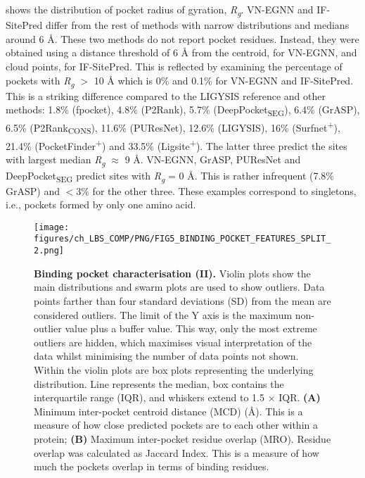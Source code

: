  shows the distribution of pocket radius of gyration, \textit{R\textsubscript{g}}. VN-EGNN and IF-SitePred differ from the rest of methods with narrow distributions and medians around 6 \AA{}. These two methods do not report pocket residues. Instead, they were obtained using a distance threshold of 6 \AA{} from the centroid, for VN-EGNN, and cloud points, for IF-SitePred. This is reflected by examining the percentage of pockets with \textit{R\textsubscript{g}} $>$ 10 \AA{} which is 0\% and 0.1\% for VN-EGNN and IF-SitePred. This is a striking difference compared to the LIGYSIS reference and other methods: 1.8\% (fpocket), 4.8\% (P2Rank), 5.7\% (DeepPocket\textsubscript{SEG}), 6.4\% (GrASP), 6.5\% (P2Rank\textsubscript{CONS}), 11.6\% (PUResNet), 12.6\% (LIGYSIS), 16\% (Surfnet\textsuperscript{+}), 21.4\% (PocketFinder\textsuperscript{+}) and 33.5\% (Ligsite\textsuperscript{+}). The latter three predict the sites with largest median \textit{R\textsubscript{g}} $\approx$ 9 \AA{}. VN-EGNN, GrASP, PUResNet and DeepPocket\textsubscript{SEG} predict sites with \textit{R\textsubscript{g}} = 0 \AA{}. This is rather infrequent (7.8\% GrASP) and $<$3\% for the other three. These examples correspond to singletons, i.e., pockets formed by only one amino acid.

\begin{figure}[ht!]
    \centering
    \texttt{[image: figures/ch\_LBS\_COMP/PNG/FIG5\_BINDING\_POCKET\_FEATURES\_SPLIT\_2.png]}
    \caption[Binding pocket characterisation (II)]{\textbf{Binding pocket characterisation (II).} Violin plots show the main distributions and swarm plots are used to show outliers. Data points farther than four standard deviations (SD) from the mean are considered outliers. The limit of the Y axis is the maximum non-outlier value plus a buffer value. This way, only the most extreme outliers are hidden, which maximises visual interpretation of the data whilst minimising the number of data points not shown. Within the violin plots are box plots representing the underlying distribution. Line represents the median, box contains the interquartile range (IQR), and whiskers extend to 1.5 $\times$ IQR. \textbf{(A)} Minimum inter-pocket centroid distance (MCD) (\AA{}). This is a measure of how close predicted pockets are to each other within a protein; \textbf{(B)} Maximum inter-pocket residue overlap (MRO). Residue overlap was calculated as Jaccard Index. This is a measure of how much the pockets overlap in terms of binding residues.}
    \label{fig:pocket_features_2}
\end{figure}

